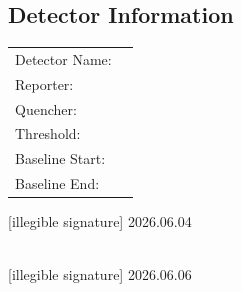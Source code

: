 \documentclass[UTF8,10pt,a4paper,fontset=fandol]{ctexart}
\newcommand{\handwritten}[1]{#1}
\begin{document}
\subsection{Detector Information}

\begin{tabular}{@{}ll@{}}
Detector Name: & \\[2pt]
Reporter: & \\[2pt]
Quencher: & \\[2pt]
Threshold: & \\[2pt]
Baseline Start: & \\[2pt]
Baseline End: &
\end{tabular}

\vfill

\begin{flushright}
\handwritten{[illegible signature]}
\qquad
\handwritten{2026.06.04}

\\[1em]

\handwritten{[illegible signature]}
\qquad
\handwritten{2026.06.06}
\end{flushright}


\newpage
\end{document}
